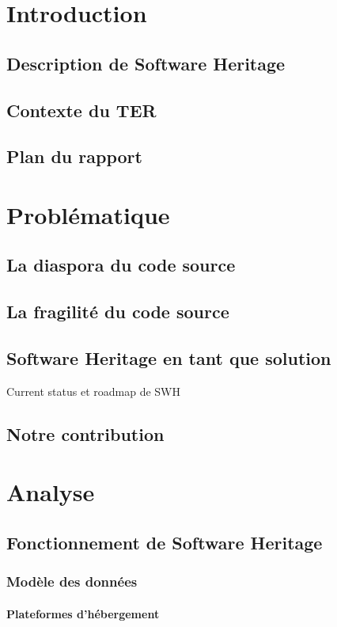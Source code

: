 \documentclass[12pt,a4paper]{report}
\begin{document}
\chapter{Introduction}
	\section{Description de Software Heritage}
	
	\section{Contexte du TER}
	\section{Plan du rapport}

\chapter{Problématique}
\section{La diaspora du code source}
\section{La fragilité du code source}
\section{Software Heritage en tant que solution}
	Current status et roadmap de SWH
\section{Notre contribution}

\chapter{Analyse}
\section{Fonctionnement de Software Heritage}
	\subsection{Modèle des données}
		\subsubsection{Plateformes d'hébergement}
\end{document}
